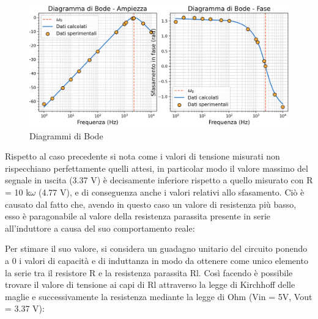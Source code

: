 \begin{figure}[H]
    \centering
    \includegraphics[width=0.6\linewidth]{bode2.png}
    \caption{Diagrammi di Bode}
    \label{fig:enter-label}
\end{figure}

Rispetto al caso precedente si nota come i valori di tensione misurati non rispecchiano perfettamente quelli
attesi, in particolar modo il valore massimo del segnale in uscita (3.37 V) è decisamente inferiore rispetto a
quello misurato con R = 10 k$\omega$ (4.77 V), e di conseguenza anche i valori relativi allo sfasamento. Ciò è causato
dal fatto che, avendo in questo caso un valore di resistenza più basso, esso è paragonabile al valore della
resistenza parassita presente in serie all’induttore a causa del suo comportamento reale:

\begin{figure}[!ht]
\centering %
%
\label{fig:my_label}
\end{figure}


Per stimare il suo valore, si considera un guadagno unitario del circuito ponendo a 0 i valori di capacità e di induttanza in modo da ottenere come unico elemento la serie tra il resistore R e la resistenza parassita Rl. Così facendo è possibile trovare il valore di tensione ai capi di Rl attraverso la legge di Kirchhoff delle maglie e successivamente la resistenza mediante la legge di Ohm (Vin = 5V, Vout = 3.37 V):

